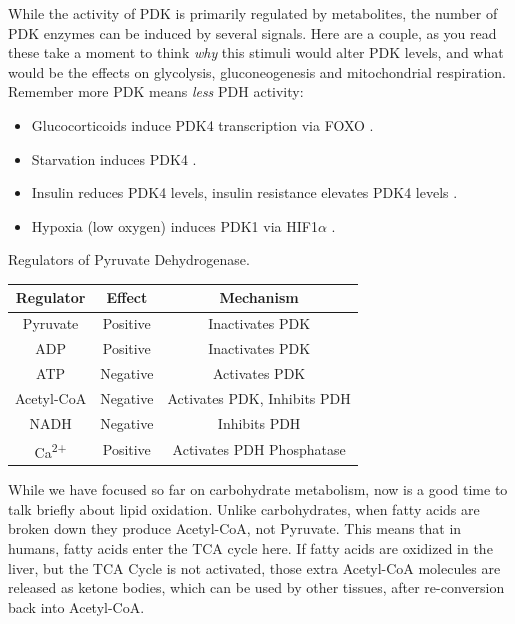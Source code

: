 \documentclass{tufte-handout}
\begin{document}
  While the activity of PDK is primarily regulated by metabolites, the number of PDK enzymes can be induced by several signals.  Here are a couple, as you read these take a moment to think \emph{why} this stimuli would alter PDK levels, and what would be the effects on glycolysis, gluconeogenesis and mitochondrial respiration.  Remember more PDK means \emph{less} PDH activity:

\begin{itemize}
	\item Glucocorticoids induce PDK4 transcription via FOXO \citep{Connaughton2010a}.
	\item Starvation induces PDK4 \citep{WU1998}.
	\item Insulin reduces PDK4 levels, insulin resistance elevates PDK4 levels \citep{Harris2001}.
	\item Hypoxia (low oxygen) induces PDK1 via HIF1$\alpha$ \citep{Kim2006}.
\end{itemize}

\begin{margintable}
\centering
\caption{Regulators of Pyruvate Dehydrogenase.}
\label{tab:pdh-regulators}
\begin{tabular}{ccc}
\hline
\textbf {Regulator} & \textbf{Effect} &\textbf{Mechanism}  \\
\hline
Pyruvate & Positive & Inactivates PDK\\
ADP & Positive & Inactivates PDK\\
ATP & Negative & Activates PDK\\
Acetyl-CoA & Negative &  Activates PDK, Inhibits PDH\\
NADH & Negative & Inhibits PDH\\
Ca\textsuperscript{2+} &  Positive & Activates PDH Phosphatase \\
\hline
\end{tabular}
\end{margintable}

  While we have focused so far on carbohydrate metabolism, now is a good time to talk briefly about lipid oxidation.  Unlike carbohydrates, when fatty acids are broken down they produce Acetyl-CoA, not Pyruvate.  This means that in humans, fatty acids enter the TCA cycle here.  If fatty acids are oxidized in the liver, but the TCA Cycle is not activated, those extra Acetyl-CoA molecules are released as ketone bodies, which can be used by other tissues, after re-conversion back into Acetyl-CoA.
\end{document}
